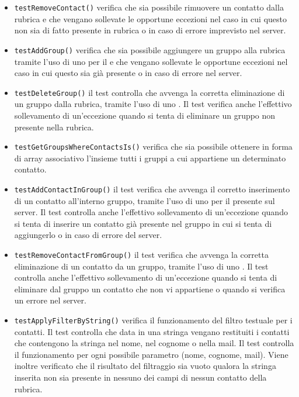 \begin{itemize}
\begin{itemize}
\item \texttt{testRemoveContact()} verifica che sia possibile rimuovere un contatto dalla rubrica e che vengano sollevate le opportune eccezioni nel caso in cui questo non sia di fatto presente in rubrica o in caso di errore imprevisto nel server.

\item \texttt{testAddGroup()} verifica che sia possibile aggiungere un gruppo alla rubrica tramite l'uso di uno  per il  e che vengano sollevate le opportune eccezioni nel caso in cui questo sia già presente o in caso di errore nel server.

\item \texttt{testDeleteGroup()} il test controlla che avvenga la corretta eliminazione di un gruppo dalla rubrica, tramite l'uso di uno . Il test verifica anche l'effettivo sollevamento di un'eccezione quando si tenta di eliminare un gruppo non presente nella rubrica.

\item \texttt{testGetGroupsWhereContactsIs()} verifica che sia possibile ottenere in forma di array associativo l'insieme tutti i gruppi a cui appartiene un determinato contatto.

\item \texttt{testAddContactInGroup()} il test verifica che avvenga il corretto inserimento di un contatto all'interno gruppo, tramite l'uso di uno  per il  presente sul server. Il test controlla anche l'effettivo sollevamento di un'eccezione quando si tenta di inserire un contatto già presente nel gruppo in cui si tenta di aggiungerlo o in caso di errore del server.

\item \texttt{testRemoveContactFromGroup()} il test verifica che avvenga la corretta eliminazione di un contatto da un gruppo, tramite l'uso di uno . Il test controlla anche l'effettivo sollevamento di un'eccezione quando si tenta di eliminare dal gruppo un contatto che non vi appartiene o quando si verifica un errore nel server.

\item \texttt{testApplyFilterByString()} verifica il funzionamento del filtro testuale per i contatti. Il test controlla che data in  una stringa vengano restituiti i contatti che contengono la stringa nel nome, nel cognome o nella mail. Il test controlla il funzionamento per ogni possibile parametro (nome, cognome, mail). Viene inoltre verificato che il risultato del filtraggio sia vuoto qualora la stringa inserita non sia presente in nessuno dei campi di nessun contatto della rubrica.


\end{itemize}
\end{itemize}
